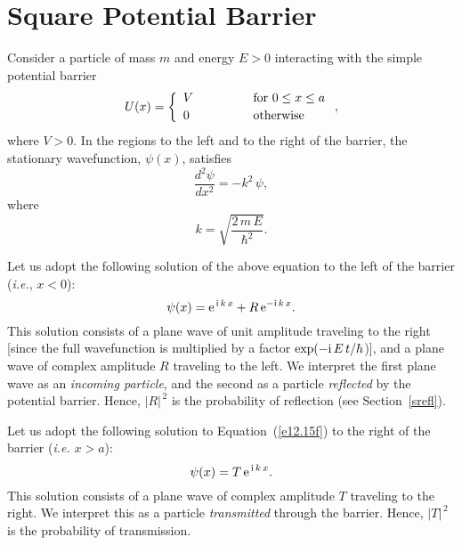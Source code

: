 \section{Square Potential Barrier}
Consider a particle of mass $m$ and energy $E>0$ interacting with the
simple  potential barrier
\begin{equation}
U(x) = \left\{\begin{array}{lcl}
V&\mbox{\hspace{1cm}}&\mbox{for $0\leq x\leq a$}\\[0.5ex]
0&&\mbox{otherwise}
\end{array}
\right.,
\end{equation}
where $V>0$. In the regions to the left and to the right of the
barrier, the stationary wavefunction, $\psi(x)$, satisfies
\begin{equation}\label{e12.15f}
\frac{d^2 \psi}{d x^2} = - k^2\,\psi,
\end{equation}
where
\begin{equation}
k = \sqrt{\frac{2\,m\,E}{\hbar^2}}.
\end{equation}

 Let us adopt the following solution
of the above equation to the left of the barrier ({\em i.e.}, $x<0$):
\begin{equation}
\psi(x) = {\rm e}^{\,{\rm i}\,k\,x} + R\,{\rm e}^{-{\rm i}\,k\,x}.
\end{equation}
This solution consists of a plane wave of unit amplitude traveling to
the right [since the full  wavefunction is multiplied by a factor
$\exp(-{\rm i}\,E\,t/\hbar$)], and a plane wave of complex amplitude $R$ traveling to
the left. We interpret the first plane wave as an {\em incoming particle}, and
the second as a particle {\em reflected}\/ by the potential barrier. Hence, $|R|^{\,2}$ is
the probability of reflection (see Section~\ref{srefl}).

Let us adopt the following solution to Equation~(\ref{e12.15f}) to the right
of the barrier ({\em i.e.} $x>a$):
\begin{equation}
\psi(x) = T\,{\rm e}^{\,{\rm i}\,k\,x}.
\end{equation}
This solution consists of a plane wave of complex amplitude $T$
traveling to the right. We interpret this as a particle {\em transmitted}\/ through
the barrier. Hence, $|T|^{\,2}$ is the probability of transmission. 

